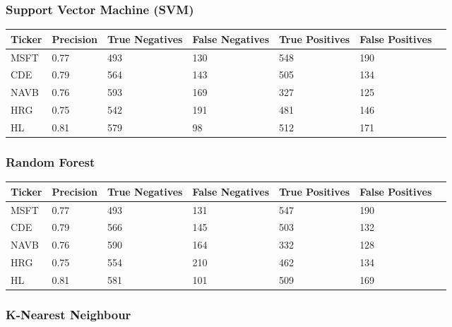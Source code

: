 \subsubsection{Support Vector Machine (SVM)}

\begin{center}
    \begin{tabular}{ | l | l | l | | l | l | l | p{5cm} |}
    \hline
    Ticker & Precision & True Negatives & False Negatives & True Positives & False Positives \\ \hline
    MSFT & 0.77 & 493 & 130 & 548 & 190 \\ \hline
    CDE & 0.79 & 564 & 143 & 505 & 134 \\ \hline
    NAVB & 0.76 & 593 & 169 & 327 & 125 \\ \hline
    HRG & 0.75 & 542 & 191 & 481 & 146 \\ \hline
    HL & 0.81 & 579 & 98 & 512 & 171 \\
    \hline
    \end{tabular}
\end{center}

\subsubsection{Random Forest}

\begin{center}
    \begin{tabular}{ | l | l | l | | l | l | l | p{5cm} |}
    \hline
    Ticker & Precision & True Negatives & False Negatives & True Positives & False Positives \\ \hline
    MSFT & 0.77 & 493 & 131 & 547 & 190 \\ \hline
    CDE & 0.79 & 566 & 145 & 503 & 132 \\ \hline
    NAVB & 0.76 & 590 & 164 & 332 & 128 \\ \hline
    HRG & 0.75 & 554 & 210 & 462 & 134 \\ \hline
    HL & 0.81 & 581 & 101 & 509 & 169 \\
    \hline
    \end{tabular}
\end{center}

\subsubsection{K-Nearest Neighbour}

